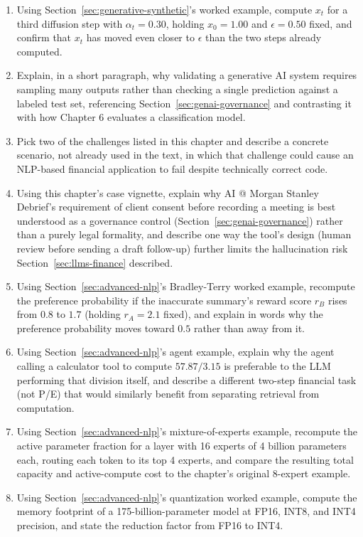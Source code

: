 \documentclass[../ai_in_finance]{subfiles}
\begin{document}
\begin{enumerate}
    \item Using Section~\ref{sec:generative-synthetic}'s worked example, compute $x_t$ for a third diffusion step with $\alpha_t = 0.30$, holding $x_0 = 1.00$ and $\epsilon = 0.50$ fixed, and confirm that $x_t$ has moved even closer to $\epsilon$
     than the two steps already computed.
    \item Explain, in a short paragraph, why validating a generative AI system requires sampling many outputs rather than checking a single prediction against a labeled test set, referencing Section~\ref{sec:genai-governance} and contrasting it with how Chapter 6 evaluates a classification model.
    \item Pick two of the challenges listed in this chapter and describe a concrete scenario, not already used in the text, in which that challenge could cause an NLP-based financial application to fail despite technically correct code.
    \item Using this chapter's case vignette, explain why AI @ Morgan Stanley Debrief's requirement of client consent before recording a meeting is best understood as a governance control (Section~\ref{sec:genai-governance}) rather than a purely legal formality, and describe one way the tool's design (human review before sending a draft follow-up) further limits the hallucination risk Section~\ref{sec:llms-finance} described.
    \item Using Section~\ref{sec:advanced-nlp}'s Bradley-Terry worked example, recompute the preference probability if the inaccurate summary's reward score $r_B$ rises from $0.8$ to $1.7$ (holding $r_A = 2.1$ fixed), and explain in words why the preference probability moves toward $0.5$ rather than away from it.
    \item Using Section~\ref{sec:advanced-nlp}'s agent example, explain why the agent calling a calculator tool to compute $57.87/3.15$ is preferable to the LLM performing that division itself, and describe a different two-step financial task (not P/E) that would similarly benefit from separating retrieval from computation.
    \item Using Section~\ref{sec:advanced-nlp}'s mixture-of-experts example, recompute the active parameter fraction for a layer with 16 experts of 4 billion parameters each, routing each token to its top 4 experts, and compare the resulting total capacity and active-compute cost to the chapter's original 8-expert example.
    \item Using Section~\ref{sec:advanced-nlp}'s quantization worked example, compute the memory footprint of a 175-billion-parameter model at FP16, INT8, and INT4 precision, and state the reduction factor from FP16 to INT4.

\end{enumerate}
\end{document}
